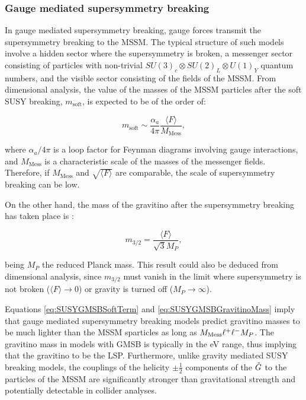 \subsubsection{Gauge mediated supersymmetry breaking}
\label{subsubsec:GMSB}

In gauge mediated supersymmetry breaking, gauge forces transmit the supersymmetry breaking to the MSSM.
The typical structure of such models involve a hidden sector where the supersymmetry is broken, a messenger sector consisting of particles with non-trivial $SU(3)_c\otimes SU(2)_L\otimes U(1)_Y$ quantum numbers, and the visible sector consisting of the fields of the MSSM.
From dimensional analysis, the value of the masses of the MSSM particles after the soft SUSY breaking, $m_\text{soft}$, is expected to be of the order of:

\begin{equation}
m_\text{soft} \sim \frac{\alpha_a}{4\pi} \frac{\langle F \rangle}{M_\text{Mess}},
\label{eq:SUSYGMSBSoftTerm}
\end{equation}

\noindent where $\alpha_a / 4\pi$ is a loop factor for Feynman diagrams involving gauge interactions, and $M_\text{Mess}$ is a characteristic scale of the masses of the messenger fields.
Therefore, if $M_\text{Mess}$ and $\sqrt{\langle F \rangle}$ are comparable, the scale of supersymmetry breaking can be low.

On the other hand, the mass of the gravitino after the supersymmetry breaking has taken place is \cite{Klasen:2006kb}:

\begin{equation}
m_{3/2} = \frac{\langle F \rangle}{\sqrt{3} M_P},
\label{eq:SUSYGMSBGravitinoMass}
\end{equation}

\noindent being $M_P$ the reduced Planck mass.
This result could also be deduced from dimensional analysis, since $m_{3/2}$ must vanish in the limit where supersymmetry is not broken ($\langle F \rangle \rightarrow 0$) or gravity is turned off ($M_P \rightarrow \infty$).

Equations \ref{eq:SUSYGMSBSoftTerm} and \ref{eq:SUSYGMSBGravitinoMass} imply that gauge mediated supersymmetry breaking models predict gravitino masses to be much lighter than the MSSM sparticles as long as $M_\text{Mess} \muchless M_P$.
The gravitino mass in models with GMSB is typically in the eV range, thus implying that the gravitino to be the LSP.
Furthermore, unlike gravity mediated SUSY breaking models, the couplings of the helicity $\pm\frac{1}{2}$ components of the $\tilde{G}$ to the particles of the MSSM are significantly stronger than gravitational strength and potentially detectable in collider analyses.

